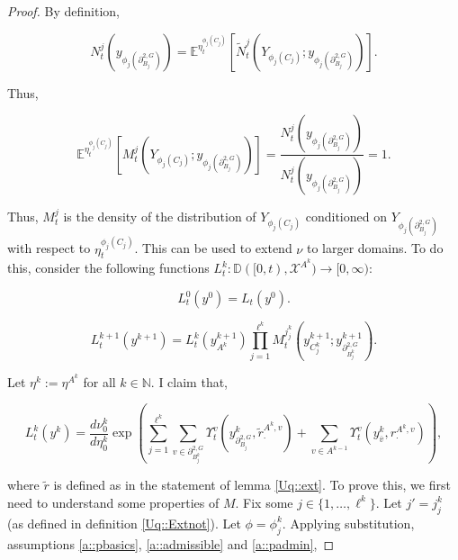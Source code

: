\documentclass[12pt]{article}
\newcommand{\mb}{\mathbb}
\newcommand{\mc}{\mathcal}
\newcommand{\ra}{\rightarrow}
\newcommand{\ov}{\overline}
\newcommand{\exmu}[2]{\mb{E}^{#1}\left[#2\right]}	%
\newcommand{\defeq}{:=}								%
\newcommand{\cad}{\mb{D}}							%
\newcommand{\sta}{\mc{X}}							%
\newcommand{\dgneigh}[2]{\partial^{2,#1}_{#2}}		%
\newcommand{\cl}[1]{\ov{#1}}						%
\newcommand{\indx}[1]{^{#1}}						%
\newcommand{\rate}{r}								%
\newcommand{\xg}{y}									%
\newcommand{\vind}[1]{_{#1}}						%
\newcommand{\vpara}[1]{^{#1}}						%
\newcommand{\stpara}[1]{_{#1}}						%
\newcommand{\tpara}[1]{_{#1}}						%
\newcommand{\gvpara}[2]{^{#1,#2}}					%
\newcommand{\psize}{\ell}							%
\newcommand{\Xg}{Y}									%
\newcommand{\brate}{\alt{\rate}}					%
\newcommand{\alt}[1]{\tilde{#1}}					%
\newcommand{\mm}{\nu}								%
\newcommand{\mmm}{\eta}								%
\newcommand{\ds}{\Upsilon}							%
\newcommand{\dense}{L}								%
\newcommand{\densen}{N}								%
\newcommand{\denseph}{\alt{N}}						%
\newcommand{\mdense}{M}								%
\newcommand{\jpara}[1]{^{#1}}						%
\begin{document}
\begin{proof}
By definition, 

\[\densen\jpara{j}\tpara{t}(\xg\vind{\phi_j(\dgneigh{G}{B_j})}) = \exmu{\mmm\vpara{\phi_j(C_j)}\tpara{t}}{\denseph\jpara{j}\tpara{t}(\Xg\vind{\phi_j(C_j)};\xg\vind{\phi_j(\dgneigh{G}{B_j})})}.\]

Thus,

\[\exmu{\mmm\vpara{\phi_j(C_j)}\tpara{t}}{\mdense\jpara{j}\tpara{t}(\Xg\vind{\phi_j(C_j)};\xg\vind{\phi_j(\dgneigh{G}{B_j})})} = \frac{\densen\jpara{j}\tpara{t}(\xg\vind{\phi_j(\dgneigh{G}{B_j})})}{\densen\jpara{j}\tpara{t}(\xg\vind{\phi_j(\dgneigh{G}{B_j})})} = 1.\]

Thus, \(\mdense\jpara{j}\tpara{t}\) is the density of the distribution of \(\Xg\vind{\phi_j(C_j)}\) conditioned on \(\Xg\vind{\phi_j(\dgneigh{G}{B_j})}\) with respect to \(\mmm\vpara{\phi_j(C_j)}\tpara{t}\). This can be used to extend \(\mm\) to larger domains. To do this, consider the following functions \(\dense\indx{k}\tpara{t}: \cad([0,t),\sta^{A\indx{k}}) \ra [0,\infty)\):

\[\dense\indx{0}\tpara{t}(\xg\indx{0}) = \dense\tpara{t}(\xg\indx{0}).\]

\[\dense\indx{k+1}\tpara{t}(\xg\indx{k+1}) = \dense\indx{k}\tpara{t}(\xg\indx{k+1}\vind{A\indx{k}})\prod_{j=1}^{\psize\indx{k}}\mdense\jpara{j\indx{k}_j}\tpara{t}\left(\xg\indx{k+1}\vind{C_j\indx{k}};\xg\indx{k+1}\vind{\dgneigh{G}{B\indx{k}_j}}\right).\]

Let \(\mmm\indx{k} \defeq \mmm\vpara{A\indx{k}}\) for all \(k\in \mb{N}\). I claim that,

\[\dense\indx{k}\tpara{t}(\xg\indx{k}) = \frac{d\mm\indx{k}\tpara{0}}{d\mmm\indx{k}\tpara{0}}\exp\left(\sum_{j=1}^{\psize\indx{k}}\sum_{v\in \dgneigh{G}{B_j\indx{k}}} \ds\vpara{v}\tpara{t}\left(\xg\indx{k}\vind{\dgneigh{G}{B_j}},\brate\gvpara{A\indx{k}}{v}\stpara{\cdot}\right) + \sum_{v \in A\indx{k-1}} \ds\vpara{v}\tpara{t}\left(\xg\indx{k}\vind{\cl{v}},\rate\gvpara{A\indx{k}}{v}\stpara{\cdot}\right)\right),\]

where \(\brate\) is defined as in the statement of lemma \ref{Uq::ext}. To prove this, we first need to understand some properties of \(\mdense\). Fix some \(j \in \{1,\dots,\psize\indx{k}\}\). Let \(j' = j\indx{k}_j\) (as defined in definition \ref{Uq::Extnot}). Let \(\phi = \phi\indx{k}_j\). Applying substitution, assumptions \ref{a::pbasics}, \ref{a::admissible} and \ref{a::padmin},


\end{proof}
\end{document}
